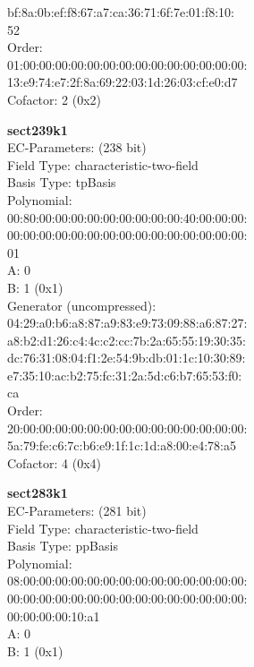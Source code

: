     bf:8a:0b:ef:f8:67:a7:ca:36:71:6f:7e:01:f8:10:\\
    52\\
Order: \\
    01:00:00:00:00:00:00:00:00:00:00:00:00:00:00:\\
    13:e9:74:e7:2f:8a:69:22:03:1d:26:03:cf:e0:d7\\
Cofactor:  2 (0x2)\\
\item \textbf{ sect239k1 }\\
EC-Parameters: (238 bit)\\
Field Type: characteristic-two-field\\
Basis Type: tpBasis\\
Polynomial:\\
    00:80:00:00:00:00:00:00:00:00:00:40:00:00:00:\\
    00:00:00:00:00:00:00:00:00:00:00:00:00:00:00:\\
    01\\
A:    0\\
B:    1 (0x1)\\
Generator (uncompressed):\\
    04:29:a0:b6:a8:87:a9:83:e9:73:09:88:a6:87:27:\\
    a8:b2:d1:26:c4:4c:c2:cc:7b:2a:65:55:19:30:35:\\
    dc:76:31:08:04:f1:2e:54:9b:db:01:1c:10:30:89:\\
    e7:35:10:ac:b2:75:fc:31:2a:5d:c6:b7:65:53:f0:\\
    ca\\
Order: \\
    20:00:00:00:00:00:00:00:00:00:00:00:00:00:00:\\
    5a:79:fe:c6:7c:b6:e9:1f:1c:1d:a8:00:e4:78:a5\\
Cofactor:  4 (0x4)\\
\item \textbf{ sect283k1 }\\
EC-Parameters: (281 bit)\\
Field Type: characteristic-two-field\\
Basis Type: ppBasis\\
Polynomial:\\
    08:00:00:00:00:00:00:00:00:00:00:00:00:00:00:\\
    00:00:00:00:00:00:00:00:00:00:00:00:00:00:00:\\
    00:00:00:00:10:a1\\
A:    0\\
B:    1 (0x1)\\
